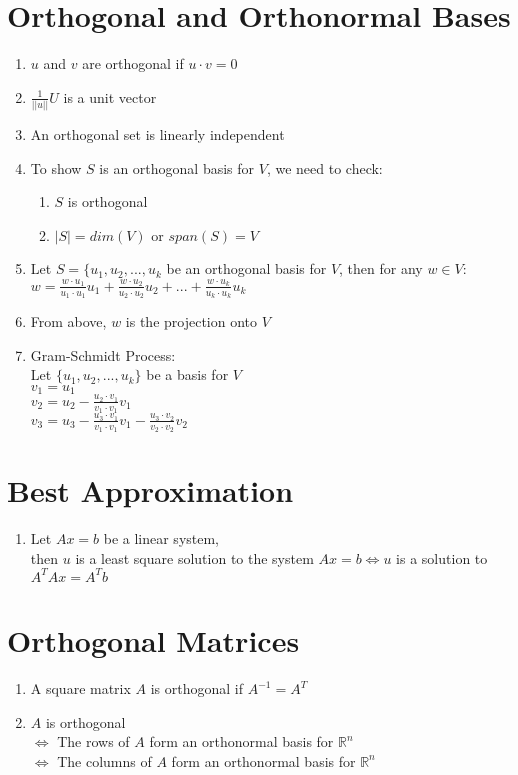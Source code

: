 \documentclass{article}
\begin{document}
\section*{Orthogonal and Orthonormal Bases}
\begin{enumerate}
    \item $u$ and $v$ are orthogonal if $u \cdot v = 0$
    \item $\frac{1}{||u||} U$ is a unit vector
    \item An orthogonal set is linearly independent
    \item To show $S$ is an orthogonal basis for $V$, we need to check: \begin{enumerate}
        \item $S$ is orthogonal
        \item $|S| = dim(V)$ or $span(S) = V$
    \end{enumerate}
    \item Let $S = \{u_1, u_2, ..., u_k$ be an orthogonal basis for $V$, then for any $w \in V$: $w = \frac{w\cdot u_1}{u_1 \cdot u_1}u_1 + \frac{w\cdot u_2}{u_2 \cdot u_2}u_2 + ... + \frac{w\cdot u_k}{u_k \cdot u_k}u_k$
    \item From above, $w$ is the projection onto $V$
    \item Gram-Schmidt Process: \\ 
    Let $\{u_1, u_2, ..., u_k\}$ be a basis for $V$ \\
    $v_1 = u_1$ \\
    $v_2 = u_2 - \frac{u_2 \cdot v_1}{v_1 \cdot v_1}v_1$ \\
    $v_3 = u_3 - \frac{u_3 \cdot v_1}{v_1 \cdot v_1}v_1 - \frac{u_3 \cdot v_2}{v_2 \cdot v_2}v_2$ \\   
\end{enumerate}

\section*{Best Approximation}
\begin{enumerate}
    \item Let $Ax = b$ be a linear system, \\
    then $u$ is a least square solution to the system $Ax = b \Leftrightarrow u$ is a solution to $A^TAx = A^Tb$
\end{enumerate}

\section*{Orthogonal Matrices}
\begin{enumerate}
    \item A square matrix $A$ is orthogonal if $A^{-1} = A^T$
    \item $A$ is orthogonal \\
    $\Leftrightarrow$ The rows of $A$ form an orthonormal basis for $\mathbb{R}^n$ \\
    $\Leftrightarrow$ The columns of $A$ form an orthonormal basis for $\mathbb{R}^n$
    
\end{enumerate}
\end{document}

